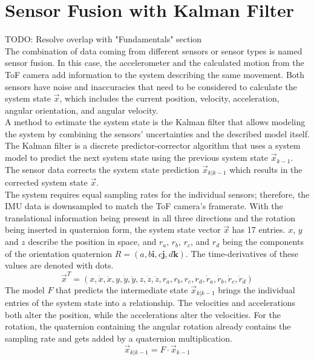 \section{Sensor Fusion with Kalman Filter}
\label{sec:SensorFusion}
TODO: Resolve overlap with "Fundamentals" section\\
The combination of data coming from different sensors or sensor types is named sensor fusion. In this case, the accelerometer and the calculated motion from the ToF camera add information to the system describing the same movement. Both sensors have noise and inaccuracies that need to be considered to calculate the system state $\vec{x}$, which includes the current position, velocity, acceleration, angular orientation, and angular velocity.\\
A method to estimate the system state is the Kalman filter that allows modeling the system by combining the sensors' uncertainties and the described model itself. The Kalman filter is a discrete predictor-corrector algorithm that uses a system model to predict the next system state using the previous system state $\vec{x}_{k-1}$. The sensor data corrects the system state prediction $\vec{x}_{k|k-1}$ which results in the corrected system state $\vec{x}$.\\
The system requires equal sampling rates for the individual sensors; therefore, the IMU data is downsampled to match the ToF camera's framerate.
With the translational information being present in all three directions and the rotation being inserted in quaternion form, the system state vector $\vec{x}$ has 17 entries. $x$, $y$ and $z$ describe the position in space, and $r_{a}$, $r_{b}$, $r_{c}$, and $r_{d}$ being the components of the orientation quaternion $R = (a, b\textbf{i}, c\textbf{j}, d\textbf{k})$. The time-derivatives of these values are denoted with dots.
\begin{equation*}
    \vec{x}^{T} = (
        x, \dot{x}, \ddot{x}, y, \dot{y}, \ddot{y}, z, \dot{z}, \ddot{z}, r_{a}, r_{b}, r_{c}, r_{d}, \dot{r}_{a}, \dot{r}_{b}, \dot{r}_{c}, \dot{r}_{d})
\end{equation*}
The model $F$ that predicts the intermediate state $\vec{x}_{k|k-1}$ brings the individual entries of the system state into a relationship. The velocities and accelerations both alter the position, while the accelerations alter the velocities. For the rotation, the quaternion containing the angular rotation already contains the sampling rate and gets added by a quaternion multiplication. 
\begin{equation*}
    \vec{x}_{k|k-1} = 
    F
    \cdot
    \vec{x}_{k-1}
\end{equation*}
